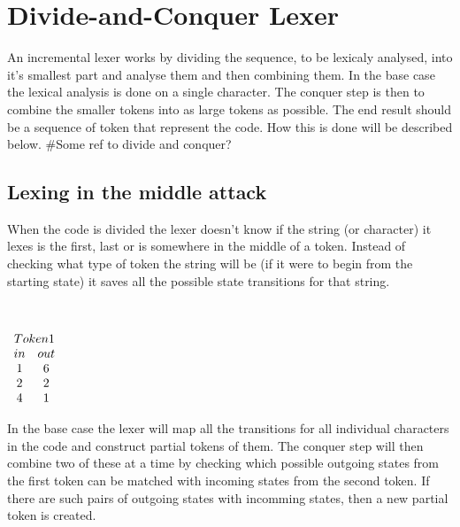 \chapter{Divide-and-Conquer Lexer}
An incremental lexer works by dividing the sequence, to be lexicaly analysed,
into it's smallest part and analyse them and then combining them. In the base
case the lexical analysis is done on a single character. The conquer step is
then to combine the smaller tokens into as large tokens as possible. The end
result should be a sequence of token that represent the code. How this is done
will be described below. \#Some ref to divide and conquer?

\section{Lexing in the middle attack} %
When the code is divided the lexer doesn't know if the string (or character) it
lexes is the first, last or is somewhere in the middle of a token. Instead of
checking what type of token the string will be (if it were to begin from the
starting state) it saves all the possible state transitions for that string.
\begin{example}\label{transMap}
\mbox{}\\
\begin{center}$\begin{array}{cc}
\multicolumn{2}{c}{Token 1}\\
in & out\\
1 & 6\\
2 & 2\\
4 & 1\\
\end{array}$
\end{center}
\end{example}
In the base case the lexer will map all the transitions for all individual
characters in the code and construct partial tokens of them. The conquer step
will then combine two of these at a time by checking which possible outgoing
states from the first token can be matched with incoming states from the second
token. If there are such pairs of outgoing states with incomming states, then a
new partial token is created.
